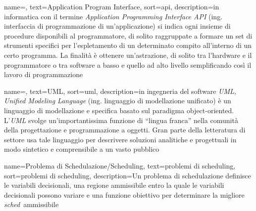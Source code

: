 
\renewcommand{\acronymname}{Acronimi e abbreviazioni}





\renewcommand{\glossaryname}{Glossario}

{
    name=,
    text=Application Program Interface,
    sort=api,
    description={in informatica con il termine \emph{Application Programming Interface API} (ing. interfaccia di programmazione di un'applicazione) si indica ogni insieme di procedure disponibili al programmatore, di solito raggruppate a formare un set di strumenti specifici per l'espletamento di un determinato compito all'interno di un certo programma. La finalità è ottenere un'astrazione, di solito tra l'hardware e il programmatore o tra software a basso e quello ad alto livello semplificando così il lavoro di programmazione}
}

{
    name=,
    text=UML,
    sort=uml,
    description={in ingegneria del software \emph{UML, Unified Modeling Language} (ing. linguaggio di modellazione unificato) è un linguaggio di modellazione e specifica basato sul paradigma object-oriented. L'\emph{UML} svolge un'importantissima funzione di ``lingua franca'' nella comunità della progettazione e programmazione a oggetti. Gran parte della letteratura di settore usa tale linguaggio per descrivere soluzioni analitiche e progettuali in modo sintetico e comprensibile a un vasto pubblico}
}

{
    name=Problema di Schedulazione/Scheduling,
    text=problemi di scheduling,
    sort=problemi di scheduling,
    description={Un problema di schedulazione definisce le variabili decisionali, una regione ammissibile entro la quale le variabili decisionali possono variare e una funzione obiettivo per determinare la migliore \emph{\gls{sched}}\glsfirstoccur\ ammissibile}
}

